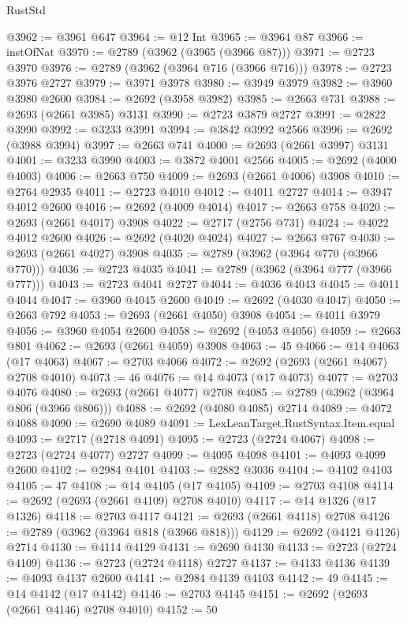 \begin{lexlean}{RustStd}
\begin{coremodule}
@3962 := @3961 @647
@3964 := @12 Int
@3965 := @3964 @87
@3966 := instOfNat
@3970 := @2789 (@3962 (@3965 (@3966 @87)))
@3971 := @2723 @3970
@3976 := @2789 (@3962 (@3964 @716 (@3966 @716)))
@3978 := @2723 @3976 @2727
@3979 := @3971 @3978
@3980 := @3949 @3979
@3982 := @3960 @3980 @2600
@3984 := @2692 (@3958 @3982)
@3985 := @2663 @731
@3988 := @2693 (@2661 @3985) @3131
@3990 := @2723 @3879 @2727
@3991 := @2822 @3990
@3992 := @3233 @3991
@3994 := @3842 @3992 @2566
@3996 := @2692 (@3988 @3994)
@3997 := @2663 @741
@4000 := @2693 (@2661 @3997) @3131
@4001 := @3233 @3990
@4003 := @3872 @4001 @2566
@4005 := @2692 (@4000 @4003)
@4006 := @2663 @750
@4009 := @2693 (@2661 @4006) @3908
@4010 := @2764 @2935
@4011 := @2723 @4010
@4012 := @4011 @2727
@4014 := @3947 @4012 @2600
@4016 := @2692 (@4009 @4014)
@4017 := @2663 @758
@4020 := @2693 (@2661 @4017) @3908
@4022 := @2717 (@2756 @731)
@4024 := @4022 @4012 @2600
@4026 := @2692 (@4020 @4024)
@4027 := @2663 @767
@4030 := @2693 (@2661 @4027) @3908
@4035 := @2789 (@3962 (@3964 @770 (@3966 @770)))
@4036 := @2723 @4035
@4041 := @2789 (@3962 (@3964 @777 (@3966 @777)))
@4043 := @2723 @4041 @2727
@4044 := @4036 @4043
@4045 := @4011 @4044
@4047 := @3960 @4045 @2600
@4049 := @2692 (@4030 @4047)
@4050 := @2663 @792
@4053 := @2693 (@2661 @4050) @3908
@4054 := @4011 @3979
@4056 := @3960 @4054 @2600
@4058 := @2692 (@4053 @4056)
@4059 := @2663 @801
@4062 := @2693 (@2661 @4059) @3908
@4063 := 45
@4066 := @14 @4063 (@17 @4063)
@4067 := @2703 @4066
@4072 := @2692 (@2693 (@2661 @4067) @2708 @4010)
@4073 := 46
@4076 := @14 @4073 (@17 @4073)
@4077 := @2703 @4076
@4080 := @2693 (@2661 @4077) @2708
@4085 := @2789 (@3962 (@3964 @806 (@3966 @806)))
@4088 := @2692 (@4080 @4085) @2714
@4089 := @4072 @4088
@4090 := @2690 @4089
@4091 := LexLeanTarget.RustSyntax.Item.equal
@4093 := @2717 (@2718 @4091)
@4095 := @2723 (@2724 @4067)
@4098 := @2723 (@2724 @4077) @2727
@4099 := @4095 @4098
@4101 := @4093 @4099 @2600
@4102 := @2984 @4101
@4103 := @2882 @3036
@4104 := @4102 @4103
@4105 := 47
@4108 := @14 @4105 (@17 @4105)
@4109 := @2703 @4108
@4114 := @2692 (@2693 (@2661 @4109) @2708 @4010)
@4117 := @14 @1326 (@17 @1326)
@4118 := @2703 @4117
@4121 := @2693 (@2661 @4118) @2708
@4126 := @2789 (@3962 (@3964 @818 (@3966 @818)))
@4129 := @2692 (@4121 @4126) @2714
@4130 := @4114 @4129
@4131 := @2690 @4130
@4133 := @2723 (@2724 @4109)
@4136 := @2723 (@2724 @4118) @2727
@4137 := @4133 @4136
@4139 := @4093 @4137 @2600
@4141 := @2984 @4139 @4103
@4142 := 49
@4145 := @14 @4142 (@17 @4142)
@4146 := @2703 @4145
@4151 := @2692 (@2693 (@2661 @4146) @2708 @4010)
@4152 := 50

\end{coremodule}
\end{lexlean}
